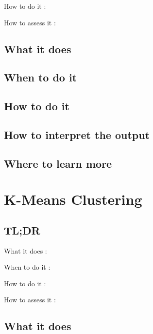 \documentclass[
]{book}
\begin{document}
How to do it
:

How to assess it
:

\hypertarget{what-it-does-21}{%
\section{What it does}\label{what-it-does-21}}

\hypertarget{when-to-do-it-21}{%
\section{When to do it}\label{when-to-do-it-21}}

\hypertarget{how-to-do-it-21}{%
\section{How to do it}\label{how-to-do-it-21}}

\hypertarget{how-to-interpret-the-output-21}{%
\section{How to interpret the output}\label{how-to-interpret-the-output-21}}

\hypertarget{where-to-learn-more-21}{%
\section{Where to learn more}\label{where-to-learn-more-21}}

\hypertarget{k-means-clustering}{%
\chapter{K-Means Clustering}\label{k-means-clustering}}

\hypertarget{tldr-22}{%
\section{TL;DR}\label{tldr-22}}

What it does
:

When to do it
:

How to do it
:

How to assess it
:

\hypertarget{what-it-does-22}{%
\section{What it does}\label{what-it-does-22}}
\end{document}
